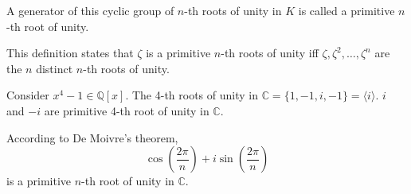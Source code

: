 \begin{definition}
    A generator of this cyclic group of $n$-th roots of unity in $K$ is called a primitive $n$-th root of unity.
\end{definition}

This definition states that $\zeta$ is a primitive $n$-th roots of unity iff $\zeta, \zeta^2, \ldots, \zeta^n$ 
are the $n$ distinct $n$-th roots of unity.

\begin{example}
    Consider $x^4 - 1 \in \mathbb{Q}[x]$. The 4-th roots of unity in $\mathbb{C} = \{1, -1, i, -1\} = \langle i \rangle$.
    $i$ and $-i$ are primitive 4-th root of unity in $\mathbb{C}$.
\end{example}

\begin{example}
    According to De Moivre's theorem,
    \[
        \cos \left(\frac{2 \pi}{n}\right) + i \sin \left(\frac{2 \pi}{n}\right)
    \]
    is a primitive $n$-th root of unity in $\mathbb{C}$.
\end{example}